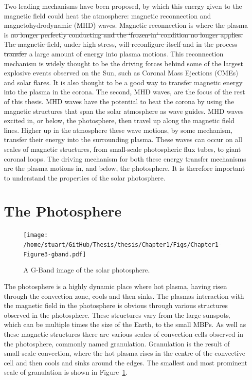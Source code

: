 \documentclass[a4paper,12pt,fourier,authoryear,custommargin]{Classes/PhDThesisPSnPDF}
\providecommand{\DIFaddtex}[1]{{\protect\color{blue}\uwave{#1}}} %
\providecommand{\DIFdeltex}[1]{{\protect\color{red}\sout{#1}}}                      %
\providecommand{\DIFaddbegin}{} %
\providecommand{\DIFaddend}{} %
\providecommand{\DIFdelbegin}{} %
\providecommand{\DIFdelend}{} %
\providecommand{\DIFadd}[1]{\texorpdfstring{\DIFaddtex{#1}}{#1}} %
\providecommand{\DIFdel}[1]{\texorpdfstring{\DIFdeltex{#1}}{}} %
\begin{document}
Two leading mechanisms have been proposed, by which this energy given to the magnetic field could heat the atmosphere: magnetic reconnection and magnetohydrodynamic (MHD) waves.
Magnetic reconnection is where the plasma is \DIFdelbegin \DIFdel{no longer perfectly conducting and the `frozen-in' condition no longer applies.
The magnetic field, }\DIFdelend under high stress, \DIFdelbegin \DIFdel{will reconfigure itself and }\DIFdelend \DIFaddbegin \DIFadd{and reconfigures itself, }\DIFaddend in the process \DIFdelbegin \DIFdel{transfer }\DIFdelend \DIFaddbegin \DIFadd{transferring }\DIFaddend a large amount of energy into plasma motions.
This reconnection mechanism is widely thought to be the driving forces behind some of the largest explosive events observed on the Sun, such as Coronal Mass Ejections (CMEs) and solar flares.
It is also thought to be a good way to transfer magnetic energy into the plasma in the corona.
The second, MHD waves, are the focus of the rest of this thesis.
MHD waves have the potential to heat the corona by using the magnetic structures that span the solar atmosphere as wave guides.
MHD waves excited in, or below, the photosphere, then travel up along the magnetic field lines.
Higher up in the atmosphere these wave motions, by some mechanism, transfer their energy into the surrounding plasma.
These waves can occur on all scales of magnetic structures, from small-scale photospheric flux tubes, to giant coronal loops.
The driving mechanism for both these energy transfer mechanisms are the plasma motions in, and below, the photosphere.
It is therefore important to understand the properties of the solar photosphere.

\section{The Photosphere} 



\begin{figure}[h]
    \centering
    \texttt{[image: /home/stuart/GitHub/Thesis/thesis/Chapter1/Figs/Chapter1-Figure3-gband.pdf]}
    \caption{A G-Band image of the solar photosphere.}
    \label{fig:gband}
\end{figure}

The photosphere is a highly dynamic place where hot plasma, having risen through the convection zone, cools and then sinks.
The plasmas interaction with the magnetic field in the photosphere is obvious through various structures observed in the photosphere.
These structures vary from the large sunspots, which can be multiple times the size of the Earth, to the small MBPs. %
As well as these magnetic structures there are various scales of convection cells observed in the photosphere, commonly named granulation.
Granulation is the result of small-scale convection, where the hot plasma rises in the centre of the convective cell and then cools and sinks around the edges.
The smallest and most prominent scale of granulation is shown in Figure~\ref{fig:gband}.
\end{document}

